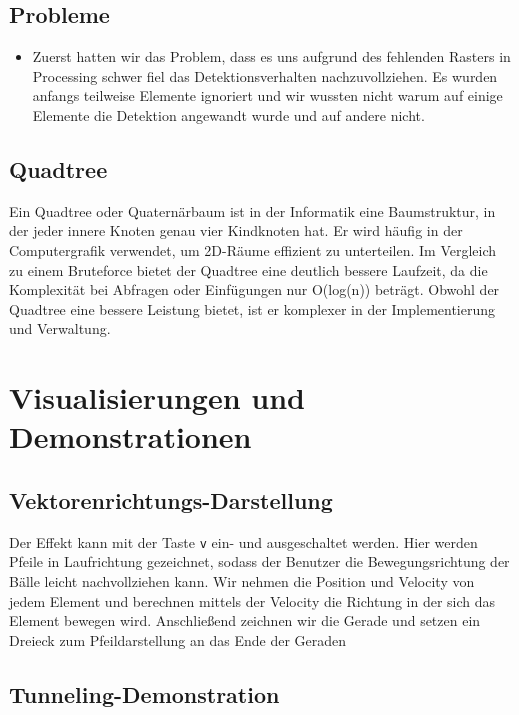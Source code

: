 \documentclass[12pt,a4paper]{article}
\begin{document}
	\subsection{Probleme}
	\begin{itemize}
		\item
		Zuerst hatten wir das Problem, dass es uns aufgrund des fehlenden Rasters in Processing schwer fiel das Detektionsverhalten nachzuvollziehen. Es wurden anfangs teilweise Elemente ignoriert und wir wussten nicht warum auf einige Elemente die Detektion angewandt wurde und auf andere nicht.
	\end{itemize}
\subsection{Quadtree}
Ein Quadtree oder Quaternärbaum ist in der Informatik eine Baumstruktur, in der jeder innere Knoten genau vier Kindknoten hat. \cite{Quadtree} Er wird häufig in der Computergrafik verwendet, um 2D-Räume effizient zu unterteilen. Im Vergleich zu einem Bruteforce bietet der Quadtree eine deutlich bessere Laufzeit, da die Komplexität bei Abfragen oder Einfügungen nur O(log(n)) beträgt. Obwohl der Quadtree eine bessere Leistung bietet, ist er komplexer in der Implementierung und Verwaltung.

	
	\section{Visualisierungen und Demonstrationen}
	
	
	\subsection{Vektorenrichtungs-Darstellung}
	
	Der Effekt kann mit der Taste \texttt{v} ein- und ausgeschaltet werden.  
	Hier werden Pfeile in Laufrichtung gezeichnet, sodass der Benutzer die Bewegungsrichtung der Bälle leicht nachvollziehen kann.  
	Wir nehmen die Position und Velocity von jedem Element und berechnen mittels der Velocity die Richtung in der sich das Element bewegen wird. Anschließend zeichnen wir die Gerade und setzen ein Dreieck zum Pfeildarstellung an das Ende der Geraden
		
	
	\subsection{Tunneling-Demonstration}
	
\end{document}
